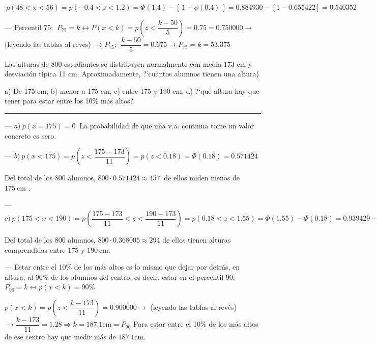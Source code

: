 \begin{ejemplo}
\begin{ejre}
$\  p(48<x<56) = p(-0.4<z<1.2) = \Phi(1.4)-[ \ 1-\phi(0.4) \ ]= 0.884930-[1-0.655422]=0.540352$

--- Percentil 75: $\ P_{75}= k \leftrightarrow P(x<k)=p \left( z<\dfrac{k-50}{5} \right) =0.75=0.750000 \to $ \textcolor{gris} (leyendo las tablas al reves) $\to P_{75}:\ \ \dfrac{k-50}{5}=0.675 \to P_{75}=k=53.375$
\end{ejre}	
\end{ejemplo}

\vspace{4mm}%
\begin{ejemplo}
\begin{ejre}
	Las alturas de 800 estudiantes se distribuyen normalmente con media 173 cm y desviación típica 11 cm. Aproximadamente, ?`cuántos alumnos tienen una altura)
	
	a) De 175 cm; b) menor a 175 cm; c) entre 175 y 190 cm; d) ?`qué altura hay que tener para estar entre los 10\% más altos?

\rule{250pt}{0.1pt}

--- $a)\ p(x=175)=0\ $ La probabilidad de que una v.a. continua tome un valor concreto es cero.

--- $b)\ p(x<175)=p \left( z<\dfrac{175-173}{11} \right) = p(z<0.18)=\Phi(0.18)=0.571424$

Del total de los $800$ alumnos, $800\cdot 0.571424\approx 457 \ $ de ellos miden menos de $175 \ \mathrm{cm}$ .

--- $ c) \ p(175<x<190)=p\left( \dfrac{175-173}{11}<z<\dfrac{190-173}{11} \right)=p(0.18<z<1.55)=\Phi(1.55)-\Phi(0.18)=0.939429-0.571424=0.368005$

Del total de los $800$ alumnos, $800 \cdot 0.368005\approx 294$ de ellos tienen alturas comprendidas entre $175 \text{  y } 190 \ \mathrm{cm}$.

--- Estar entre el 10\% de los más altos es lo mismo que dejar por detrás, en altura, al 90\% de los alumnos del centro; es decir, estar en el percentil 90: $P_{90}=k \leftrightarrow p(x<k)=90\%$

$p(x<k)=p\left(z< \dfrac{k-173}{11} \right) =0.900000 \to $ \textcolor{gris} (leyendo las tablas al revés) $\to \dfrac{k-173}{11}=1.28 \Rightarrow k=187.1 \mathrm{cm}=P_{90}$ Para estar entre el 10\% de los más altos de ese centro hay que medir más de $187.1 \mathrm{cm}$.

\end{ejre}	
\end{ejemplo}

